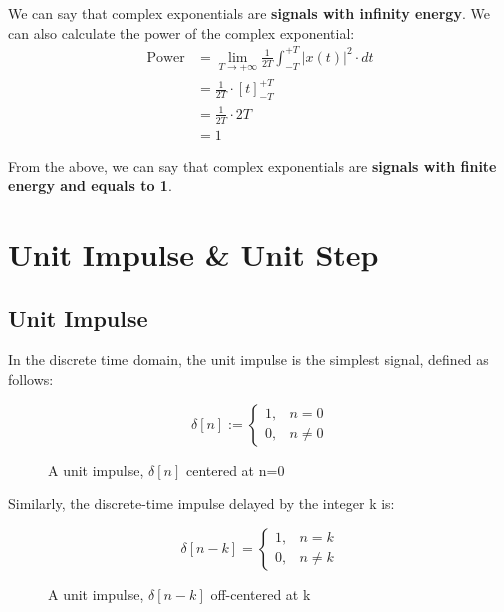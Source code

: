 \documentclass[letterpaper,12pt]{article}
\begin{document}
We can say that complex exponentials are \textbf{signals with infinity energy}.
We can also calculate the power of the complex exponential:
\begin{equation*}
    \begin{aligned}
        \text{Power} & = \lim_{T \to +\infty} \frac{1}{2T}\int_{-T}^{+T}\left|x\left(t\right)\right|^{2}\cdot dt \\
                     & = \frac{1}{2T}\cdot[t]^{+T}_{-T}                                                          \\
                     & = \frac{1}{2T}\cdot2T                                                                     \\
                     & = 1
    \end{aligned}
\end{equation*}

From the above, we can say that complex exponentials are \textbf{signals with
    finite energy and equals to 1}.

\newpage
\section{Unit Impulse \& Unit Step}
\subsection{Unit Impulse}
In the discrete time domain, the unit impulse is the simplest signal, defined
as follows:

\[\delta[n] :=
    \begin{cases}
        1, & n = 0    \\
        0, & n \neq 0
    \end{cases}
\]

\begin{figure}[!ht]
    \centering
    
    \caption{A unit impulse, $\delta[n]$ centered at n=0}\label{fig:unit_impulse}
\end{figure}

Similarly, the discrete-time impulse delayed by the integer k is:

\[\delta[n - k] =
    \begin{cases}
        1, & n = k    \\
        0, & n \neq k
    \end{cases}
\]

\begin{figure}[!ht]
    \centering
    
    \caption{A unit impulse, $\delta[n-k]$ off-centered at k}
    \label{fig:unit_impulse_off_center}
\end{figure}
\end{document}

